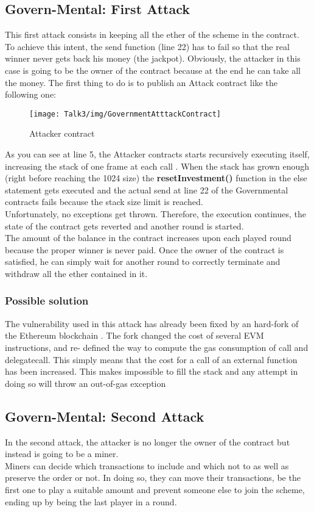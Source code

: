 \subsection{Govern-Mental: First Attack}
This first attack consists in keeping all the ether of the scheme in the contract. To achieve this intent, the send function (line 22) has to fail so that the real winner never gets back his money (the jackpot).
Obviously, the attacker in this case is going to be the owner of the contract because at the end he can take all the money.
The first thing to do is to publish an Attack contract like the following one:
\begin{figure}[H]
\begin{center}
\texttt{[image: Talk3/img/GovernmentAtttackContract]}
\end{center}
\caption{Attacker contract}
\label{label}
\end{figure}
As you can see at line 5, the Attacker contracts starts recursively executing itself, increasing the stack of one frame at each call \cite{paper2}.
When the stack has grown enough (right before reaching the 1024 size) the \textbf{resetInvestment()} function in the else statement gets executed and the actual send at line 22 of the Governmental contracts fails because the stack size limit is reached.\\
Unfortunately, no exceptions get thrown. Therefore, the execution continues, the state of the contract gets reverted and another round is started.\\
The amount of the balance in the contract increases upon each played round because the proper winner is never paid. Once the owner of the contract is satisfied, he can simply wait for another round to correctly terminate and withdraw all the ether contained in it.
\subsubsection{Possible solution}
The vulnerability used in this attack has already been fixed by an hard-fork of the Ethereum blockchain \cite{hardfork}. The fork changed the cost of several EVM instructions, and re- defined the way to compute the gas consumption of call and delegatecall\cite{paper2}.
This simply means that the cost for a call of an external function has been increased. This makes impossible to fill the stack and any attempt in doing so will throw an out-of-gas exception
\subsection{Govern-Mental: Second Attack}
In the second attack, the attacker is no longer the owner of the contract but instead is going to be a miner.\\
Miners can decide which transactions to include and which not to as well as preserve the order or not. In doing so, they can move their transactions, be the first one to play a suitable amount and prevent someone else to join the scheme, ending up by being the last player in a round.

